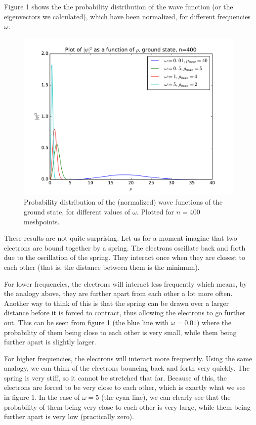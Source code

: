 \documentclass[12pt]{article}
\begin{document}
Figure 1 shows the the probability distribution of the wave function (or the eigenvectors we calculated), which have been normalized, for different frequencies $\omega$.
\begin{figure}[hbtp]
\centering
\includegraphics[width=\linewidth]{Plots/Plot_groundstate_n400.pdf}
\caption{Probability distribution of the (normalized) wave functions of the ground state, for different values of $\omega$. Plotted for $n=400$ meshpoints.}
\end{figure}
These results are not quite surprising. Let us for a moment imagine that two electrons are bound together by a spring. The electrons oscillate back and forth due to the oscillation of the spring. They interact once when they are closest to each other (that is, the distance between them is the minimum).

For lower frequencies, the electrons will interact less frequently which means, by the analogy above, they are further apart from each other a lot more often. Another way to think of this is that the spring can be drawn over a larger distance before it is forced to contract, thus allowing the electrons to go further out. This can be seen from figure 1 (the blue line with $\omega = 0.01$) where the probability of them being close to each other is very small, while them being further apart is slightly larger.

For higher frequencies, the electrons will interact more frequently. Using the same analogy, we can think of the electrons bouncing back and forth very quickly. The spring is very stiff, so it cannot be stretched that far. Because of this, the electrons are forced to be very close to each other, which is exactly what we see in figure 1. In the case of $\omega = 5$ (the cyan line), we can clearly see that the probability of them being very close to each other is very large, while them being further apart is very low (practically zero).
\end{document}
